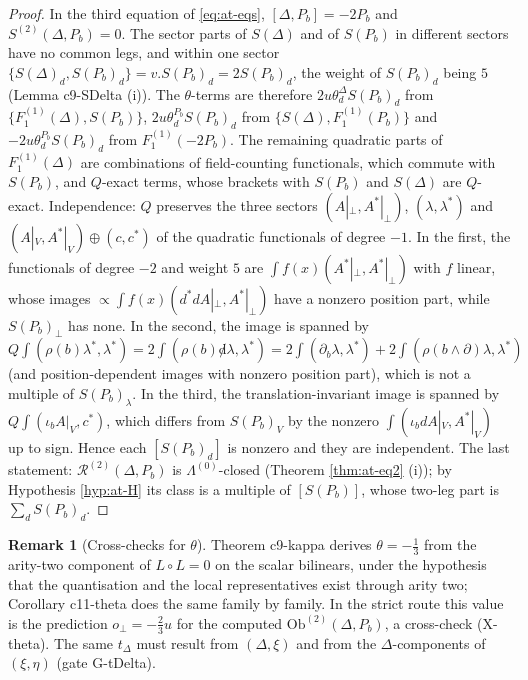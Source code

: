 \documentclass[11pt]{article}
\numberwithin{equation}{section}
\theoremstyle{plain}
\theoremstyle{definition}
\newtheorem{remark}[theorem]{Remark}
\newcommand{\Ap}{A|_{\perp}}
\newcommand{\AV}{A|_V}
\newcommand{\Ob}{\mathrm{Ob}}
\newcommand{\dslash}{{\not d}}
\begin{document}
\begin{proof}
In the third equation of \eqref{eq:at-eqs}, $[\Delta,P_b]=-2P_b$ and $S^{(2)}(\Delta,P_b)=0$. The sector parts of $S(\Delta)$ and of $S(P_b)$ in different sectors have no common legs, and within one sector $\{S(\Delta)_d,S(P_b)_d\}=v.S(P_b)_d=2S(P_b)_d$, the weight of $S(P_b)_d$ being $5$ (Lemma c9-SDelta (i)). The $\theta$-terms are therefore $2u\theta^\Delta_dS(P_b)_d$ from $\{F_1^{(1)}(\Delta),S(P_b)\}$, $2u\theta^{P_b}_dS(P_b)_d$ from $\{S(\Delta),F_1^{(1)}(P_b)\}$ and $-2u\theta^{P_b}_dS(P_b)_d$ from $F_1^{(1)}(-2P_b)$. The remaining quadratic parts of $F_1^{(1)}(\Delta)$ are combinations of field-counting functionals, which commute with $S(P_b)$, and $Q$-exact terms, whose brackets with $S(P_b)$ and $S(\Delta)$ are $Q$-exact. Independence: $Q$ preserves the three sectors $(\Ap,A^*|_\perp)$, $(\lambda,\lambda^*)$ and $(\AV,A^*|_V)\oplus(c,c^*)$ of the quadratic functionals of degree $-1$. In the first, the functionals of degree $-2$ and weight $5$ are $\int f(x)(A^*|_\perp,A^*|_\perp)$ with $f$ linear, whose images $\propto\int f(x)(d^*d\Ap,A^*|_\perp)$ have a nonzero position part, while $S(P_b)_\perp$ has none. In the second, the image is spanned by $Q\int(\rho(b)\lambda^*,\lambda^*)=2\int(\rho(b)\dslash\lambda,\lambda^*)=2\int(\partial_b\lambda,\lambda^*)+2\int(\rho(b\wedge\partial)\lambda,\lambda^*)$ (and position-dependent images with nonzero position part), which is not a multiple of $S(P_b)_\lambda$. In the third, the translation-invariant image is spanned by $Q\int(\iota_b\AV,c^*)$, which differs from $S(P_b)_V$ by the nonzero $\int(\iota_bd\AV,A^*|_V)$ up to sign. Hence each $[S(P_b)_d]$ is nonzero and they are independent. The last statement: $\mathcal R^{(2)}(\Delta,P_b)$ is $\Lambda^{(0)}$-closed (Theorem \ref{thm:at-eq2} (i)); by Hypothesis \ref{hyp:at-H} its class is a multiple of $[S(P_b)]$, whose two-leg part is $\sum_dS(P_b)_d$.
\end{proof}

\begin{remark}[Cross-checks for $\theta$]
\label{rem:at-thetacheck}
Theorem c9-kappa derives $\theta=-\tfrac13$ from the arity-two component of $L\circ L=0$ on the scalar bilinears, under the hypothesis that the quantisation and the local representatives exist through arity two; Corollary c11-theta does the same family by family. In the strict route this value is the prediction $o_\perp=-\tfrac23u$ for the computed $\Ob^{(2)}(\Delta,P_b)$, a cross-check (X-theta). The same $t_\Delta$ must result from $(\Delta,\xi)$ and from the $\Delta$-components of $(\xi,\eta)$ (gate G-tDelta).
\end{remark}
\end{document}
